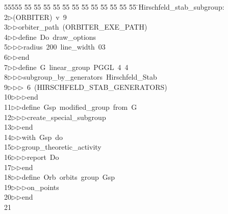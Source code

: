 %
%
\begin{tabbing}
55555 \= 55 \= 55 \= 55 \= 55 \= 55 \= 55 \= 55 \= 55 \= 55 \= 55 \= 55 \= 55 \= \>Hirschfeld\_stab\_subgroup:\\[0pt]
2\>$\triangleright$\>(ORBITER)\ v\ 9\ \\[0pt]
3\>$\triangleright$\>$\triangleright$\>orbiter\_path\ (ORBITER\_EXE\_PATH)\ \\[0pt]
4\>$\triangleright$\>$\triangleright$\>define\ Do\ draw\_options\ \\[0pt]
5\>$\triangleright$\>$\triangleright$\>$\triangleright$\>radius\ 200\ line\_width\ 03\ \\[0pt]
6\>$\triangleright$\>$\triangleright$\>end\ \\[0pt]
7\>$\triangleright$\>$\triangleright$\>define\ G\ linear\_group\ PGGL\ 4\ 4\ \\[0pt]
8\>$\triangleright$\>$\triangleright$\>$\triangleright$\>subgroup\_by\_generators\ Hirschfeld\_Stab\ \\[0pt]
9\>$\triangleright$\>$\triangleright$\>$\triangleright$\ 6\ (HIRSCHFELD\_STAB\_GENERATORS)\ \\[0pt]
10\>$\triangleright$\>$\triangleright$\>$\triangleright$\>end\ \\[0pt]
11\>$\triangleright$\>$\triangleright$\>define\ Gsp\ modified\_group\ from\ G\ \\[0pt]
12\>$\triangleright$\>$\triangleright$\>$\triangleright$\>create\_special\_subgroup\ \\[0pt]
13\>$\triangleright$\>$\triangleright$\>end\ \\[0pt]
14\>$\triangleright$\>$\triangleright$\>with\ Gsp\ do\ \\[0pt]
15\>$\triangleright$\>$\triangleright$\>group\_theoretic\_activity\ \\[0pt]
16\>$\triangleright$\>$\triangleright$\>$\triangleright$\>report\ Do\ \\[0pt]
17\>$\triangleright$\>$\triangleright$\>end\ \\[0pt]
18\>$\triangleright$\>$\triangleright$\>define\ Orb\ orbits\ group\ Gsp\ \\[0pt]
19\>$\triangleright$\>$\triangleright$\>$\triangleright$\>on\_points\ \\[0pt]
20\>$\triangleright$\>$\triangleright$\>end\\[0pt]
21\>\end{tabbing}
